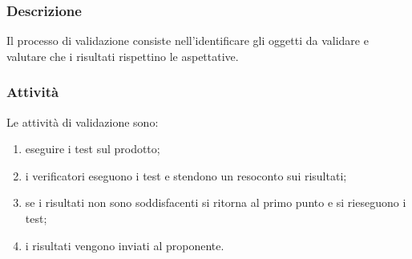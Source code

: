 		\subsubsection{Descrizione}
			Il processo di validazione consiste nell’identificare gli oggetti da validare e valutare che i risultati rispettino le aspettative.
		\subsubsection{Attività}
		   	Le attività di validazione sono:
		   	\begin{enumerate}
		   		\item eseguire i test sul prodotto;
		   		\item i verificatori eseguono i test e stendono un resoconto sui risultati;
		   		\item se i risultati non sono soddisfacenti si ritorna al primo punto e si rieseguono i test;
		   		\item i risultati vengono inviati al proponente.
		   	\end{enumerate}
			
